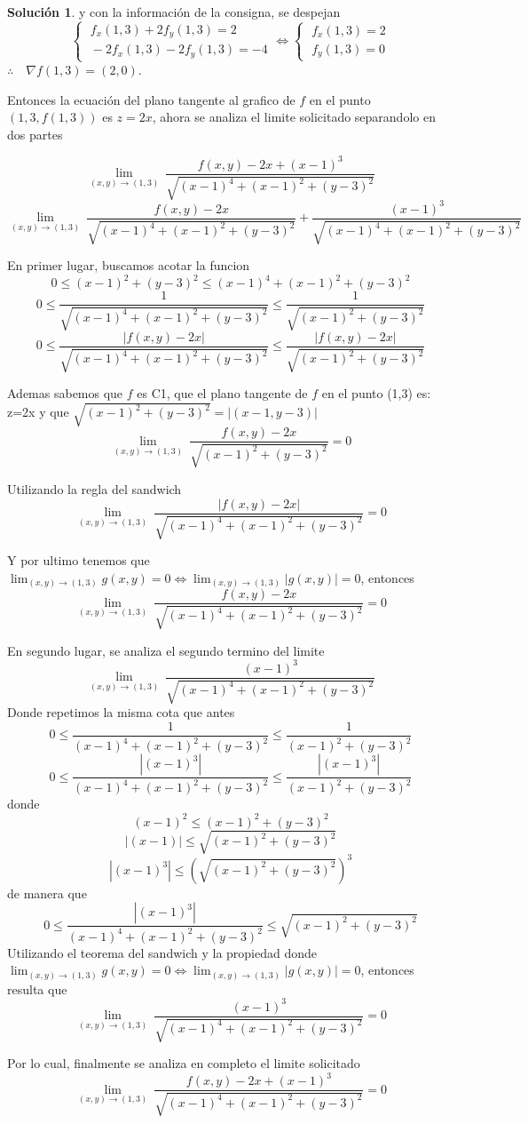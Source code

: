 \documentclass[10pt, a4paper]{report}
\theoremstyle{definition} %
\newtheorem{solution}{Solución}
\begin{document}
\begin{solution}
    y con la información de la consigna, se despejan
    \[\begin{cases}
            \;f_x(1,3) + 2f_y(1,3)=2 \\[5pt]
            \;-2f_x(1,3)- 2f_y(1,3)=-4
        \end{cases}
        \iff
        \begin{cases}
            \;f_x(1,3)=2 \\[5pt]
            \;f_y(1,3)=0
        \end{cases}
    \]
    $\therefore\quad\nabla f(1,3)=(2,0)$.

   Entonces la ecuación del plano tangente al grafico de $f$ en el punto $(1,3,f(1,3))$ es $z  = 2x$, ahora se analiza el limite solicitado separandolo en dos partes

    \[
        \lim_{(x,y)\to (1,3)} \ 
        \frac{f(x,y)-2x+(x-1)^3}{\sqrt{(x-1)^4+(x-1)^2+(y-3)^2}}
 \]
        \[
        \lim_{(x,y)\to (1,3)} \ 
        \frac{f(x,y)-2x}{\sqrt{(x-1)^4+(x-1)^2+(y-3)^2}}+ \frac{(x-1)^3}{\sqrt{(x-1)^4+(x-1)^2+(y-3)^2}} 
    \]

En primer lugar, buscamos acotar la funcion
\[
0\le (x-1)^2+(y-3)^2\le (x-1)^4+(x-1)^2+(y-3)^2
\]\[
0\le \frac{1}{\sqrt{(x-1)^4+(x-1)^2+(y-3)^2}} \le \frac{1}{\sqrt{(x-1)^2+(y-3)^2}}
\]
\[
0\le \frac{|f(x,y)-2x|}{\sqrt{(x-1)^4+(x-1)^2+(y-3)^2}} \le \frac{|f(x,y)-2x|}{\sqrt{(x-1)^2+(y-3)^2}}
\]

Ademas sabemos que $f$ es C1, que el plano tangente de $f$ en el punto (1,3) es: z=2x y que $\sqrt{(x-1)^2+(y-3)^2}=|(x-1,y-3)|$
\[
        \lim_{(x,y)\to (1,3)} \ 
        \frac{f(x,y)-2x}{\sqrt{(x-1)^2+(y-3)^2}}=0
 \]

Utilizando la regla del sandwich
\[
        \lim_{(x,y)\to (1,3)} \ 
        \frac{|f(x,y)-2x|}{\sqrt{(x-1)^4+(x-1)^2+(y-3)^2}}=0
 \]

 Y por ultimo tenemos que $  \lim_{(x,y)\to(1,3)} g(x,y)=0 \iff \lim_{(x,y)\to(1,3)} |g(x,y)|=0$, entonces
 \[
        \lim_{(x,y)\to (1,3)} \ 
        \frac{f(x,y)-2x}{\sqrt{(x-1)^4+(x-1)^2+(y-3)^2}}=0
 \]

 En segundo lugar, se analiza el segundo termino del limite
  \[
        \lim_{(x,y)\to (1,3)} \ 
       \frac{(x-1)^3}{\sqrt{(x-1)^4+(x-1)^2+(y-3)^2}} 
    \]
    Donde repetimos la misma cota que antes
    \[
0\le \frac{1}{(x-1)^4+(x-1)^2+(y-3)^2} \le \frac{1}{(x-1)^2+(y-3)^2}
\]
\[
0\le \frac{|(x-1)^3|}{(x-1)^4+(x-1)^2+(y-3)^2} \le \frac{|(x-1)^3|}{(x-1)^2+(y-3)^2}
\]
donde
\[
(x-1)^2\le(x-1)^2+(y-3)^2
\]
\[
|(x-1)|\le \sqrt{(x-1)^2+(y-3)^2}
\]
\[
|(x-1)^3|\le (\sqrt{(x-1)^2+(y-3)^2})^3
\]
de manera que
\[
0\le \frac{|(x-1)^3|}{(x-1)^4+(x-1)^2+(y-3)^2} \le \sqrt{(x-1)^2+(y-3)^2}
\]
 Utilizando el teorema del sandwich y la propiedad donde $  \lim_{(x,y)\to(1,3)} g(x,y)=0 \iff \lim_{(x,y)\to(1,3)} |g(x,y)|=0$, entonces resulta que
 \[
        \lim_{(x,y)\to (1,3)} \ 
       \frac{(x-1)^3}{\sqrt{(x-1)^4+(x-1)^2+(y-3)^2}} =0
    \]

Por lo cual, finalmente se analiza en completo el limite solicitado
 \[
        \lim_{(x,y)\to (1,3)} \ 
        \frac{f(x,y)-2x+(x-1)^3}{\sqrt{(x-1)^4+(x-1)^2+(y-3)^2}} =0      
    \]
\end{solution}
\end{document}
